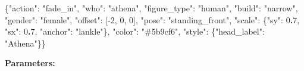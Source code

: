 \documentclass[
  11pt,
]{book}
\newenvironment{Shaded}{}{}
\newcommand{\DataTypeTok}[1]{\textcolor[rgb]{0.56,0.13,0.00}{#1}}
\newcommand{\DecValTok}[1]{\textcolor[rgb]{0.25,0.63,0.44}{#1}}
\newcommand{\ErrorTok}[1]{\textcolor[rgb]{1.00,0.00,0.00}{\textbf{#1}}}
\newcommand{\FunctionTok}[1]{\textcolor[rgb]{0.02,0.16,0.49}{#1}}
\newcommand{\OtherTok}[1]{\textcolor[rgb]{0.00,0.44,0.13}{#1}}
\newcommand{\StringTok}[1]{\textcolor[rgb]{0.25,0.44,0.63}{#1}}
\begin{document}
\begin{Shaded}
\begin{Highlighting}[]
\FunctionTok{\{}\DataTypeTok{"action"}\FunctionTok{:} \StringTok{"fade\_in"}\FunctionTok{,} \DataTypeTok{"who"}\FunctionTok{:} \StringTok{"athena"}\FunctionTok{,}
 \DataTypeTok{"figure\_type"}\FunctionTok{:} \StringTok{"human"}\FunctionTok{,} \DataTypeTok{"build"}\FunctionTok{:} \StringTok{"narrow"}\FunctionTok{,} \DataTypeTok{"gender"}\FunctionTok{:} \StringTok{"female"}\FunctionTok{,}
 \DataTypeTok{"offset"}\FunctionTok{:} \OtherTok{[}\DecValTok{{-}2}\OtherTok{,} \DecValTok{0}\OtherTok{,} \DecValTok{0}\OtherTok{]}\FunctionTok{,} \DataTypeTok{"pose"}\FunctionTok{:} \StringTok{"standing\_front"}\FunctionTok{,}
 \DataTypeTok{"scale"}\FunctionTok{:} \FunctionTok{\{}\DataTypeTok{"sy"}\FunctionTok{:} \DecValTok{0}\ErrorTok{.}\DecValTok{7}\FunctionTok{,} \DataTypeTok{"sx"}\FunctionTok{:} \DecValTok{0}\ErrorTok{.}\DecValTok{7}\FunctionTok{,} \DataTypeTok{"anchor"}\FunctionTok{:} \StringTok{"lankle"}\FunctionTok{\},}
 \DataTypeTok{"color"}\FunctionTok{:} \StringTok{"\#5b9cf6"}\FunctionTok{,}
 \DataTypeTok{"style"}\FunctionTok{:} \FunctionTok{\{}\DataTypeTok{"head\_label"}\FunctionTok{:} \StringTok{"Athena"}\FunctionTok{\}\}}
\end{Highlighting}
\end{Shaded}

\textbf{Parameters:}
\end{document}
